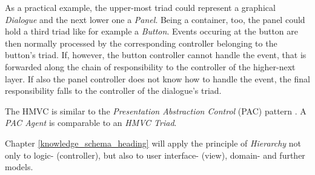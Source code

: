 As a practical example, the upper-most triad could represent a graphical
\emph{Dialogue} and the next lower one a \emph{Panel}. Being a container, too,
the panel could hold a third triad like for example a \emph{Button}. Events
occuring at the button are then normally processed by the corresponding
controller belonging to the button's triad. If, however, the button controller
cannot handle the event, that is forwarded along the chain of responsibility to
the controller of the higher-next layer. If also the panel controller does not
know how to handle the event, the final responsibility falls to the controller
of the dialogue's triad.

The HMVC is similar to the \emph{Presentation Abstraction Control} (PAC) pattern
\cite{buschmann}. A \emph{PAC Agent} is comparable to an \emph{HMVC Triad}.

Chapter \ref{knowledge_schema_heading} will apply the principle of
\emph{Hierarchy} not only to logic- (controller), but also to user interface-
(view), domain- and further models.

